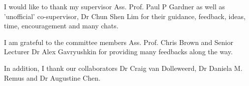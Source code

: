 \begin{acknowledgements}
I would like to thank my supervisor Ass. Prof. Paul P Gardner as well as 'unofficial' co-supervisor, Dr Chun Shen Lim for their guidance, feedback, ideas, time, encouragement and many chats. 

I am grateful to the committee members Ass. Prof. Chris Brown and Senior Lecturer Dr Alex Gavryushkin for providing many feedbacks along the way. 

In addition, I thank our collaborators Dr Craig van Dolleweerd, Dr Daniela M. Remus and Dr Augustine Chen.



\end{acknowledgements}